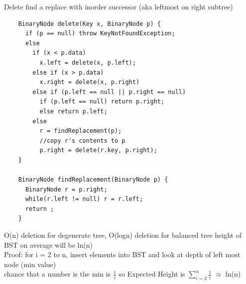 \documentclass{article}
\begin{document}
  \indent Delete find a replace with inorder successor (aka leftmost on right subtree)
  \begin{lstlisting} 
    BinaryNode delete(Key x, BinaryNode p) {
      if (p == null) throw KeyNotFoundException;
      else 
        if (x < p.data)
          x.left = delete(x, p.left);
        else if (x > p.data)
          x.right = delete(x, p.right)
        else if (p.left == null || p.right == null) 
          if (p.left == null) return p.right;
          else return p.left;
        else 
          r = findReplacement(p);
          //copy r's contents to p
          p.right = delete(r.key, p.right);
    }

    BinaryNode findReplacement(BinaryNode p) {
      BinaryNode r = p.right;
      while(r.left != null) r = r.left;
      return ;
    }
  \end{lstlisting}
  \indent \indent O(n) deletion for degenerate tree, O(logn) deletion for balanced tree
  \indent  height of BST on average will be ln(n) \\
  \indent \indent Proof: for i = 2 to n, insert elements into BST and look at depth of left most node (min value) \\
  \indent \indent chance that a number is the min is $\frac{1}{i}$ so Expected Height is $\sum_{i=2}^{n} \frac{1}{i}$ $\approx$ ln(n)
\end{document}

